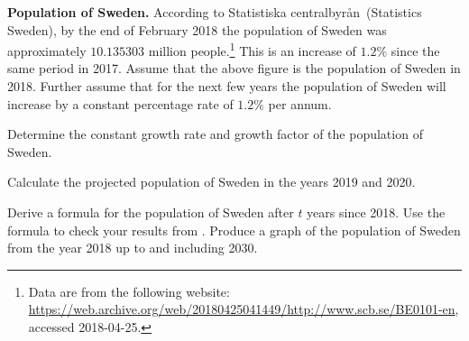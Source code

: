 \documentclass[a4paper,oneside,12pt]{article}
\begin{document}
\begin{exercise}
\textbf{Population of Sweden.}
According to Statistiska centralbyr{\aa}n~(Statistics Sweden), by the
end of February 2018 the population of Sweden was approximately
$10.135303$ million people.\footnote{
  Data are from the following website:
  \url{https://web.archive.org/web/20180425041449/http://www.scb.se/BE0101-en},
  accessed 2018-04-25.
}
This is an increase of $1.2\%$ since the same period in 2017.  Assume
that the above figure is the population of Sweden in 2018.  Further
assume that for the next few years the population of Sweden will
increase by a constant percentage rate of $1.2\%$ per annum.
\begin{packedenum}
\item\label{subex:Sweden_population_growth_rate_factor}
  Determine the constant growth rate and growth factor of the
  population of Sweden.

\item\label{subex:Sweden_population_2019_2020}
  Calculate the projected population of Sweden in the years 2019 and
  2020.

\item\label{subex:Sweden_population_formula_graph}
  Derive a formula for the population of Sweden after $t$ years since
  2018.  Use the formula to check your results
  from .  Produce a graph of
  the population of Sweden from the year 2018 up to and including
  2030.
\end{packedenum}
\end{exercise}
\end{document}
